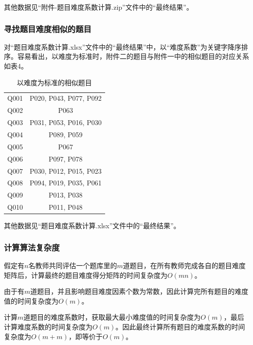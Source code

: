 其他数据见“附件-题目难度系数计算.zip”文件中的“最终结果”。

\subsubsection{寻找题目难度相似的题目}

对“题目难度系数计算.xlsx”文件中的“最终结果”中，以“难度系数”为关键字降序排序。容易看出，以难度为标准时，附件二的题目与附件一中的相似题目的对应关系如表4。

\begin{table}[htbp]
    \centering
    \label{tablesmr}
    \caption{以难度为标准的相似题目}
    \begin{tabular}{@{}cc@{}}
    \toprule
    \quad\quad\quad\quad{}\quad\quad\quad\quad\quad & \quad\quad\quad\quad{}\quad\quad\quad\quad\quad\\ \midrule
    Q001 & P020, P043, P077, P092 \\
    Q002 & P063 \\
    Q003 & P031, P053, P016, P030 \\
    Q004 & P089, P059 \\
    Q005 & P067 \\
    Q006 & P097, P078 \\
    Q007 & P030, P012, P015, P023 \\
    Q008 & P094, P019, P035, P061 \\
    Q009 & P013, P038 \\
    Q010 & P011, P048 \\ \bottomrule
    \end{tabular}
\end{table}

其他数据见“题目难度系数计算.xlsx”文件中的“最终结果”。

\subsubsection{计算算法复杂度}

假定有$n$名教师共同评估一个题库里的$m$道题目，在所有教师完成各自的题目难度矩阵后，计算最终的题目难度得分矩阵的时间复杂度为$O(mn)$。

由于有$m$道题目，并且影响题目难度因素个数为常数，因此计算完所有题目的难度值的时间复杂度为$O(m)$。

计算$m$道题目的难度系数时，获取最大最小难度值的时间复杂度为$O(m)$，最后计算难度系数的时间复杂度为$O(m)$。因此最终计算所有题目的难度系数的时间复杂度为$O(m + m)$，即等价于$O(m)$。


